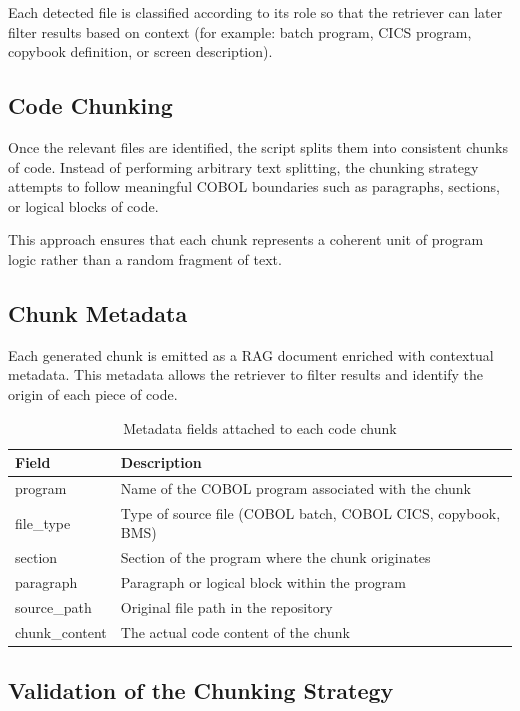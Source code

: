 \documentclass[11pt]{article}
\begin{document}
Each detected file is classified according to its role so that the retriever can later filter results based on context (for example: batch program, CICS program, copybook definition, or screen description).

\subsection*{Code Chunking}

Once the relevant files are identified, the script splits them into consistent chunks of code. Instead of performing arbitrary text splitting, the chunking strategy attempts to follow meaningful COBOL boundaries such as paragraphs, sections, or logical blocks of code.

This approach ensures that each chunk represents a coherent unit of program logic rather than a random fragment of text.

\subsection*{Chunk Metadata}

Each generated chunk is emitted as a RAG document enriched with contextual metadata. This metadata allows the retriever to filter results and identify the origin of each piece of code.

\begin{table}[h]
\centering
\begin{tabular}{|l|p{8cm}|}
\hline
\textbf{Field} & \textbf{Description} \\
\hline
program & Name of the COBOL program associated with the chunk \\
\hline
file\_type & Type of source file (COBOL batch, COBOL CICS, copybook, BMS) \\
\hline
section & Section of the program where the chunk originates \\
\hline
paragraph & Paragraph or logical block within the program \\
\hline
source\_path & Original file path in the repository \\
\hline
chunk\_content & The actual code content of the chunk \\
\hline
\end{tabular}
\caption{Metadata fields attached to each code chunk}
\end{table}

\subsection*{Validation of the Chunking Strategy}
\end{document}
